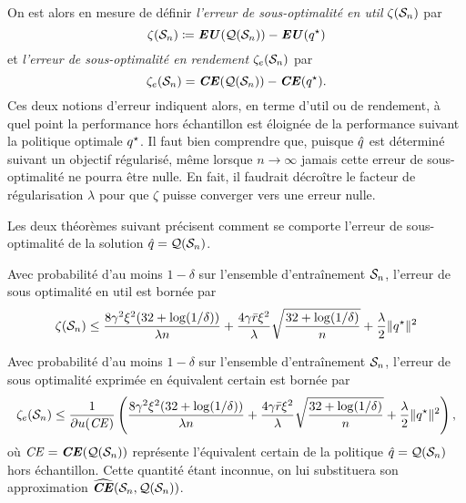 On est alors en mesure de définir \textit{l'erreur de sous-optimalité en util}
$\zeta(\S_n)$ par
\begin{equation}
  \zeta(\S_n) \coloneq \EU(\alg(\S_n)) - \EU(\qs)
\end{equation}
et \textit{l'erreur de sous-optimalité en rendement} $\zeta_e(\S_n)$ par
\begin{equation}
  \zeta_e(\S_n) = \CE(\alg(\S_n)) - \CE(\qs).
\end{equation}
Ces deux notions d'erreur indiquent alors, en terme d'util ou de rendement, à quel point
la performance hors échantillon est éloignée de la performance suivant la politique
optimale $\qs$. Il faut bien comprendre que, puisque $\qh$ est déterminé suivant un
objectif régularisé, même lorsque $n\to\infty$ jamais cette erreur de sous-optimalité ne pourra
être nulle. En fait, il faudrait décroître le facteur de régularisation $\lambda$ pour que $\zeta$
puisse converger vers une erreur nulle. 

Les deux théorèmes suivant précisent comment se comporte l'erreur de sous-optimalité de la
solution $\qh = \alg(\S_n)$.
\begin{thm}
  \label{thm3}
  Avec probabilité d'au moins $1-\delta$ sur l'ensemble d'entraînement $\S_n$, l'erreur de sous
  optimalité en util est bornée par
  \begin{equation}
    \zeta(\S_n) \leq \frac{8\gamma^2\xi^2(32+\log(1/\delta))}{\lambda n} +
    \frac{4\gamma\rmax\xi^2}{\lambda}\sqrt\frac{32+\log(1/\delta)}{n} + \frac{\lambda}{2}\|\qs\|^2 
  \end{equation}
\end{thm}

\begin{thm}
  \label{thm4}
  Avec probabilité d'au moins $1-\delta$ sur l'ensemble d'entraînement $\S_n$, l'erreur de sous
  optimalité exprimée en équivalent certain est bornée par
  \begin{equation}
    \zeta_e(\S_n) \leq \frac{1}{\partial u(\nCE)}\left( \frac{8\gamma^2\xi^2(32+\log(1/\delta))}{\lambda n} +
      \frac{4\gamma\rmax\xi^2}{\lambda}\sqrt\frac{32+\log(1/\delta)}{n} + \frac{\lambda}{2}\|\qs\|^2 \right),
  \end{equation}
  où $\nCE = \CE(\alg(\S_n))$ représente l'équivalent certain de la politique
  $\qh = \alg(\S_n)$ hors échantillon. Cette quantité étant inconnue, on lui substituera
  son approximation $\hCE(\S_n,\alg(\S_n))$.
\end{thm}


